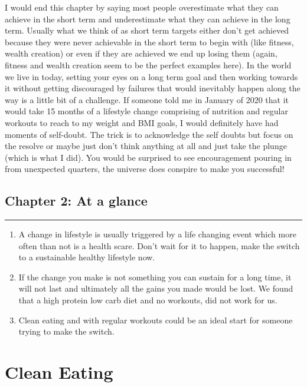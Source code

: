 \documentclass[
  oneside]{book}
\begin{document}
I would end this chapter by saying most people overestimate what they can achieve in the short term and underestimate what they can achieve in the long term. Usually what we think of as short term targets either don't get achieved because they were never achievable in the short term to begin with (like fitness, wealth creation) or even if they are achieved we end up losing them (again, fitness and wealth creation seem to be the perfect examples here). In the world we live in today, setting your eyes on a long term goal and then working towards it without getting discouraged by failures that would inevitably happen along the way is a little bit of a challenge. If someone told me in January of 2020 that it would take 15 months of a lifestyle change comprising of nutrition and regular workouts to reach to my weight and BMI goals, I would definitely have had moments of self-doubt. The trick is to acknowledge the self doubts but focus on the resolve or maybe just don't think anything at all and just take the plunge (which is what I did). You would be surprised to see encouragement pouring in from unexpected quarters, the universe does conspire to make you successful!

\hypertarget{chapter-2-at-a-glance}{%
\section{Chapter 2: At a glance}\label{chapter-2-at-a-glance}}

\begin{center}\rule{0.5\linewidth}{0.5pt}\end{center}

\begin{enumerate}
\def\labelenumi{\arabic{enumi}.}
\item
  A change in lifestyle is usually triggered by a life changing event which more often than not is a health scare. Don't wait for it to happen, make the switch to a sustainable healthy lifestyle now.
\item
  If the change you make is not something you can sustain for a long time, it will not last and ultimately all the gains you made would be lost. We found that a high protein low carb diet and no workouts, did not work for us.
\item
  Clean eating and with regular workouts could be an ideal start for someone trying to make the switch.
\end{enumerate}

\hypertarget{clean-eating}{%
\chapter{Clean Eating}\label{clean-eating}}
\end{document}
